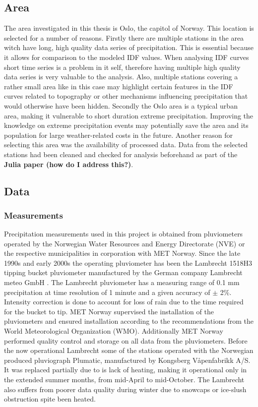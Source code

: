 
\subsection{Area}

The area investigated in this thesis is Oslo, the capitol of Norway. This location is selected for a number of reasons. Firstly there are multiple stations in the area witch have long, high quality data series of precipitation. This is essential because it allows for comparison to the modeled IDF values. When analysing IDF curves short time series is a problem in it self, therefore having multiple high quality data series is very valuable to the analysis. Also, multiple stations covering a rather small area like in this case may highlight certain features in the IDF curves related to topography or other mechanisms influencing precipitation that would otherwise have been hidden. Secondly the Oslo area is a typical urban area, making it vulnerable to short duration extreme precipitation. Improving the knowledge on extreme precipitation events may potentially save the area and its population for large weather-related costs in the future. Another reason for selecting this area was the availability of processed data. Data from the selected stations had been cleaned and checked for analysis beforehand as part of the \textbf{Julia paper (how do I address this?)}. 

\subsection{Data}
\subsubsection{Measurements}
Precipitation measurements used in this project is obtained from pluviometers operated by the Norwegian Water Resources and Energy Directorate (NVE) or the respective municipalities in corporation with  MET Norway. Since the late 1990s and early 2000s the operating pluviometer has been the Lambrecht 1518H3 tipping bucket pluviometer manufactured by the German company Lambrecht meteo GmbH \cite{lutz_idf}. The Lambrecht pluviometer has a measuring range of 0.1 mm precipitation at time resolution of 1 minute and a given accuracy of $\pm$ 2$\%$. Intensity correction is done to account for loss of rain due to the time required for the bucket to tip. MET Norway supervised the installation of the pluviometers and ensured installation according to the recommendations from the World Meteorological Organization (WMO). Additionally MET Norway performed quality control and storage on all data from the pluviometers. Before the now operational Lambrecht some of the stations operated with the Norwegian produced pluviograph Plumatic, manufactured by Kongsberg Våpenfabrikk A/S. It was replaced partially due to is lack of heating, making it operational only in the extended summer months, from mid-April to mid-October. The Lambrecht also suffers from poorer data quality during winter due to snowcaps or ice-slush obstruction spite been heated.  

